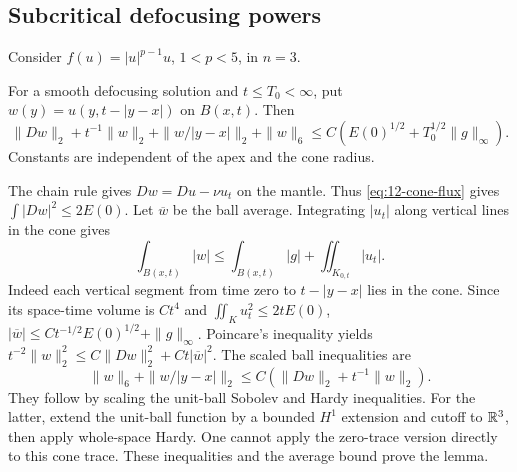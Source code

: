 \subsection{Subcritical defocusing powers}
Consider $f(u)=|u|^{p-1}u$, $1<p<5$, in $n=3$.
\begin{lemma}
For a smooth defocusing solution and $t\le T_0<\infty$, put
$w(y)=u(y,t-|y-x|)$ on $B(x,t)$. Then
\begin{equation}\label{eq:12-cone-hardy}
 \|Dw\|_2+t^{-1}\|w\|_2+\|w/|y-x|\|_2+\|w\|_6
 \le C(E(0)^{1/2}+T_0^{1/2}\|g\|_\infty).
\end{equation}
Constants are independent of the apex and the cone radius.
\end{lemma}
\begin{expandedproof}
The chain rule gives $Dw=Du-\nu u_t$ on the mantle.
Thus \eqref{eq:12-cone-flux} gives $\int|Dw|^2\le2E(0)$.
Let $\overline w$ be the ball average. Integrating $|u_t|$ along
vertical lines in the cone gives
\[
 \int_{B(x,t)}|w|\le\int_{B(x,t)}|g|
                        +\iint_{K_{0,t}}|u_t|.
\]
Indeed each vertical segment from time zero to $t-|y-x|$ lies in
the cone. Since its space-time volume is $Ct^4$ and
$\iint_Ku_t^2\le2tE(0)$,
$|\overline w|\le C t^{-1/2}E(0)^{1/2}+\|g\|_\infty$.
Poincare's inequality yields
$t^{-2}\|w\|_2^2\le C\|Dw\|_2^2+Ct|\overline w|^2$.
The scaled ball inequalities are
\[
 \|w\|_6+\|w/|y-x|\|_2
 \le C(\|Dw\|_2+t^{-1}\|w\|_2).
\]
They follow by scaling the unit-ball Sobolev and Hardy inequalities.
For the latter, extend the unit-ball function by a bounded $H^1$
extension and cutoff to $\mathbb{R}^3$, then apply whole-space Hardy.
One cannot apply the zero-trace version directly to this cone trace.
These inequalities and the average bound prove the lemma.
\end{expandedproof}

